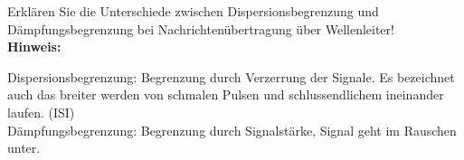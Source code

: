 \begin{question}[section=8,name={Übertragungsgrenzen},difficulty=,quantity=4,type=thr,tags={20131024}]
	Erklären Sie die Unterschiede zwischen Dispersionsbegrenzung und Dämpfungsbegrenzung bei Nachrichtenübertragung über Wellenleiter!
	\\ \textbf{Hinweis:}\\
	
\end{question}
\begin{solution}
	Dispersionsbegrenzung: Begrenzung durch Verzerrung der Signale. Es bezeichnet auch das breiter werden von schmalen Pulsen und schlussendlichem ineinander laufen. (ISI)\\
	Dämpfungsbegrenzung: Begrenzung durch Signalstärke, Signal geht im Rauschen unter.
\end{solution}
